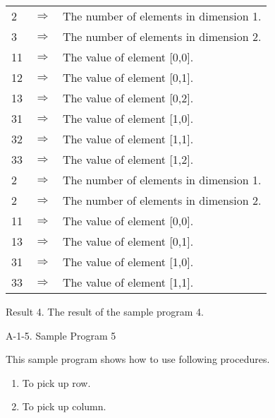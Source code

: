 \begin{center}
\begin{tabular}{|lll|}\hline
2  & $\Longrightarrow$  & The number of elements in dimension 1.\\
3  & $\Longrightarrow$  & The number of elements in dimension 2.\\
11 & $\Longrightarrow$  & The value of element [0,0].\\
12 & $\Longrightarrow$  & The value of element [0,1].\\
13 & $\Longrightarrow$  & The value of element [0,2].\\
31 & $\Longrightarrow$  & The value of element [1,0].\\
32 & $\Longrightarrow$  & The value of element [1,1].\\
33 & $\Longrightarrow$  & The value of element [1,2].\\
2  & $\Longrightarrow$  & The number of elements in dimension 1.\\
2  & $\Longrightarrow$  & The number of elements in dimension 2.\\
11 & $\Longrightarrow$  & The value of element [0,0].\\
13 & $\Longrightarrow$  & The value of element [0,1].\\
31 & $\Longrightarrow$  & The value of element [1,0].\\
33 & $\Longrightarrow$  & The value of element [1,1].\\\hline
\end{tabular}
\vspace*{5mm}

Result 4. The result of the sample program 4.
\end{center}

\vspace*{20mm}

\noindent
{\Large A-1-5. Sample Program 5}

\vspace*{7mm}

\noindent
This sample program shows how to use following procedures.

\begin{enumerate}
\item To pick up row.
\item To pick up column.
\end{enumerate}

\vspace*{5mm}

